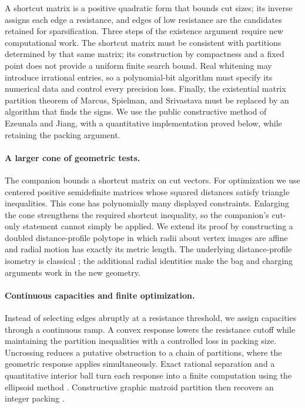 A shortcut matrix is a positive quadratic form that bounds cut sizes;
its inverse assigns each edge a resistance, and edges of low resistance
are the candidates retained for sparsification. Three steps of the
existence argument require new computational work. The shortcut matrix
must be consistent with partitions determined by that same matrix; its
construction by compactness and a fixed point does not provide a uniform
finite search bound. Real whitening may introduce irrational entries,
so a polynomial-bit algorithm must specify its numerical data and control
every precision loss. Finally, the existential matrix partition theorem
of Marcus, Spielman, and Srivastava must be replaced by an algorithm
that finds the signs. We use the public constructive method of Ezeunala
and Jiang, with a quantitative implementation proved below, while
retaining the packing argument.

\paragraph{A larger cone of geometric tests.}
The companion bounds a shortcut matrix on cut vectors. For optimization
we use centered positive semidefinite matrices whose squared distances
satisfy triangle inequalities. This cone has polynomially many displayed
constraints. Enlarging the cone strengthens the required shortcut
inequality, so the companion's cut-only statement cannot simply be
applied. We extend its proof by constructing a doubled distance-profile
polytope in which radii about vertex images are affine and radial motion
has exactly its metric length. The underlying distance-profile isometry
is classical \cite{Frechet1910,Kuratowski1935}; the additional radial
identities make the bag and charging arguments work in the new geometry.

\paragraph{Continuous capacities and finite optimization.}
Instead of selecting edges abruptly at a resistance threshold, we assign
capacities through a continuous ramp. A convex response lowers the
resistance cutoff while maintaining the partition inequalities with a
controlled loss in packing size.
Uncrossing reduces a putative obstruction to a chain of partitions,
where the geometric response applies simultaneously. Exact rational
separation and a quantitative interior ball turn each response into a
finite computation using the ellipsoid method \cite{GLS1988}.
Constructive graphic matroid partition then recovers an integer packing
\cite{Edmonds1968,Terao2023}.

